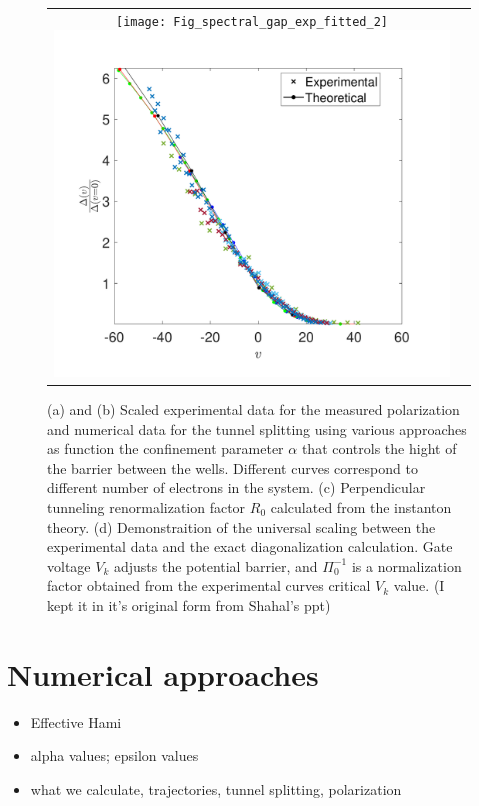 \documentclass[prb,twocolumn,showpacs,preprintnumbers,amsmath,amssymb, superscriptaddress]{revtex4-2}
\newcommand{\1}{{1\hspace*{-0.5ex} \textrm{l} \hspace*{0.5ex}}}
\begin{document}
\begin{figure}[h!]
    \begin{center}
    	\begin{tabular}{cc}
    		\texttt{[image: Fig\_spectral\_gap\_exp\_fitted\_2]}
     		\includegraphics[width=1\columnwidth]{Fig_spectral_gap_exp_log_lin_shahal_scaling_log}
    	\end{tabular}
    	


		 	\caption{(a) and (b) Scaled experimental data for the measured polarization and numerical data for the tunnel splitting using various approaches as function the confinement parameter $\alpha$ that controls the hight of the barrier between the wells. Different curves correspond to different number of electrons in the system. (c) Perpendicular tunneling renormalization factor $R_0$ calculated from the instanton theory. (d) Demonstraition of the universal scaling between the experimental data and the exact diagonalization calculation. Gate voltage $V_k$ adjusts the potential barrier, and $\Pi_0^{-1}$ is a normalization factor obtained from the experimental curves critical $V_k$ value. (I kept it in it's original form from Shahal's ppt) }
     
     \label{fig:experimental_setup}
    \end{center}
\end{figure}    
  	

\section{Numerical approaches}
\begin{itemize}
\item Effective Hami
\item alpha values; epsilon values
\item what we calculate, trajectories, tunnel splitting, polarization
\end{itemize}
\end{document}
